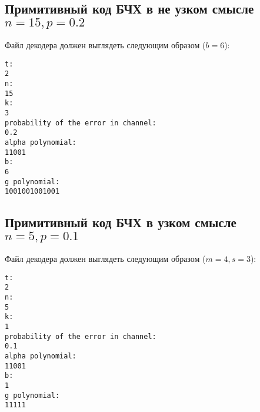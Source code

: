 \documentclass{article}
\begin{document}
\subsection{Примитивный код БЧХ в не узком смысле $n = 15, p = 0.2$}

Файл декодера должен выглядеть следующим образом ($b = 6$):

\begin{verbatim}
t:
2
n:
15
k:
3
probability of the error in channel:
0.2
alpha polynomial:
11001
b:
6
g polynomial:
1001001001001
\end{verbatim}

\subsection{Примитивный код БЧХ в узком смысле $n = 5, p = 0.1$}

Файл декодера должен выглядеть следующим образом ($m = 4, s = 3$):

\begin{verbatim}
t:
2
n:
5
k:
1
probability of the error in channel:
0.1
alpha polynomial:
11001
b:
1
g polynomial:
11111
\end{verbatim}
\end{document}
